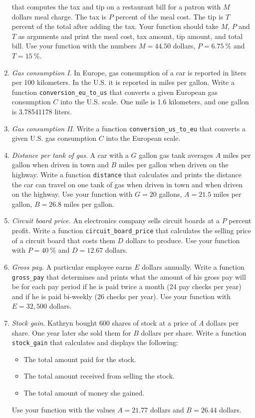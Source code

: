 \documentclass[article,A4,12pt]{llncs}
\begin{document}
\begin{enumerate}
that computes the tax and tip on a restaurant bill for a patron with 
$M$ dollars meal charge. The tax is $P$ percent of the meal cost. The tip is $T$ percent of the total after 
adding the tax. Your function should take $M$, $P$ and $T$ as arguments and print the meal cost, 
tax amount, tip amount, and total bill. Use your function with the numbers $M = 44.50$ dollars, 
$P = 6.75 \ \%$ and $T = 15 \ \%$. 
\item {\em Gas consumption I}. In Europe, gas consumption of a car is reported in liters per 100 kilometers. In the U.S. 
it is reported in miles per gallon. Write a function {\tt conversion\_eu\_to\_us} that converts a given European 
gas consumption $C$ into the U.S. scale. One mile is 1.6 kilometers, and one gallon is 3.78541178 liters. 
\item {\em Gas consumption II}. Write a function {\tt conversion\_us\_to\_eu} that converts a given U.S.
gas consumption $C$ into the European scale.
\item {\em Distance per tank of gas}. A car with a $G$ gallon gas tank averages $A$ miles per gallon 
when driven in town and 
$B$ miles per gallon when driven on the highway. Write a function {\tt distance} that calculates and prints 
the distance the car can travel on one tank of gas when driven in town and when driven on the highway. 
Use your function with $G = 20$ gallons, $A = 21.5$ miles per gallon, $B = 26.8$ miles per gallon. 
\item {\em Circuit board price.} An electronics company sells circuit boards at a $P$ percent profit. 
Write a function {\tt circuit\_board\_price} 
that calculates the selling price of a circuit board that costs them $D$ dollars to
produce. Use your function with $P = 40\ \%$ and $D = 12.67$ dollars.
\item {\em Gross pay}. A particular employee earns $E$ dollars annually. Write a function 
{\tt gross\_pay} that determines and prints what the amount of his gross pay will be for each pay period 
if he is paid twice a month (24 pay checks per year) and if he is paid bi-weekly (26 checks per 
year). Use your function with $E = 32,500$ dollars.
\item {\em Stock gain}. Kathryn bought $600$ shares of stock at a price of $A$ dollars per share. 
One year later she 
sold them for $B$ dollars per share. Write a function {\tt stock\_gain} that calculates and 
displays the following:
\begin{itemize}
\item The total amount paid for the stock.
\item The total amount received from selling the stock.
\item The total amount of money she gained.
\end{itemize}
Use your function with the values $A = 21.77$ dollars and $B = 26.44$ dollars.
\end{enumerate}
\end{document}
